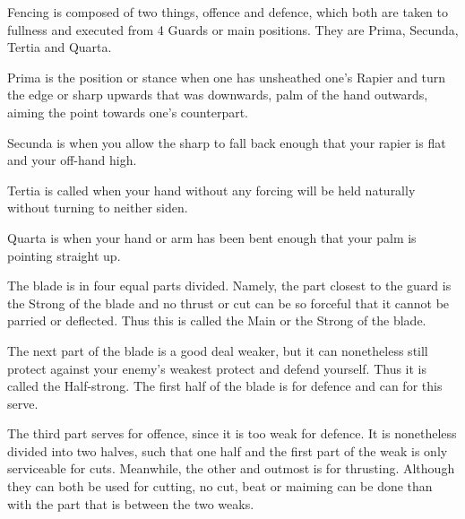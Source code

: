 \newpage


\newpage



Fencing is composed of two things, offence and defence, which both are
taken to fullness and executed from 4 Guards or main
positions. They are Prima, Secunda, Tertia and
Quarta.

Prima is the position or stance when one has unsheathed one's Rapier
and turn the edge or sharp upwards that was downwards, palm of the
hand outwards, aiming the point towards one's counterpart.

Secunda is when you allow the sharp to fall back enough that your
rapier is flat and your off-hand high.

Tertia is called when your hand without any forcing will be held
naturally without turning to neither siden.

Quarta is when your hand or arm has been bent enough that your palm is
pointing straight up.


The blade is in four equal parts divided. Namely, the part closest to
the guard is the Strong of the blade and no thrust or cut can be so
forceful that it cannot be parried or deflected. Thus this is called
the Main or the Strong of the blade.

The next part of the blade is a good deal weaker, but it can
nonetheless still protect against your enemy's weakest protect and
defend yourself. Thus it is called the Half-strong. The first half of
the blade is for defence and can for this serve.

The third part serves for offence, since it is too weak for
defence. It is nonetheless divided into two halves, such that one half
and the first part of the weak is only serviceable for
cuts. Meanwhile, the other and outmost is for thrusting. Although they
can both be used for cutting, no cut, beat or maiming can be done than
with the part that is between the two weaks.

